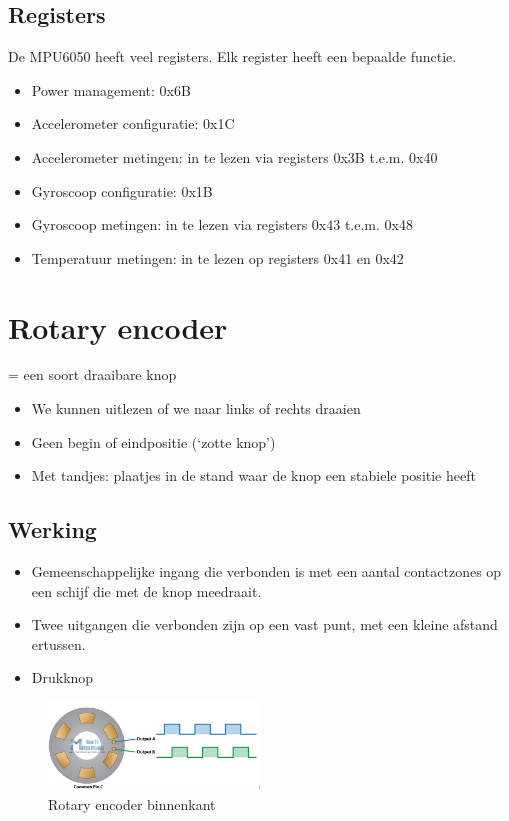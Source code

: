 \documentclass{article}
\begin{document}
\subsection{Registers}
De MPU6050 heeft veel registers. Elk register heeft een bepaalde functie.

\begin{itemize}
    \item Power management: 0x6B
    \item Accelerometer configuratie: 0x1C
    \item Accelerometer metingen: in te lezen via registers 0x3B t.e.m. 0x40
    \item Gyroscoop configuratie: 0x1B
    \item Gyroscoop metingen: in te lezen via registers 0x43 t.e.m. 0x48
    \item Temperatuur metingen: in te lezen op registers 0x41 en 0x42
\end{itemize}

\section{Rotary encoder}
= een soort draaibare knop

\begin{itemize}
    \item We kunnen uitlezen of we naar links of rechts draaien
    \item Geen begin of eindpositie (`zotte knop')
    \item Met tandjes: plaatjes in de stand waar de knop een stabiele positie heeft
\end{itemize}

\subsection{Werking}

\begin{itemize}
    \item Gemeenschappelijke ingang die verbonden is met een aantal contactzones op een schijf die met de knop meedraait.
    \item Twee uitgangen die verbonden zijn op een vast punt, met een kleine afstand ertussen.
    \item Drukknop
\end{itemize}

\begin{figure}[H]
    \centering
    \includegraphics[width=0.5\textwidth]{rotary.png}
    \caption{Rotary encoder binnenkant}
\end{figure}
\end{document}

